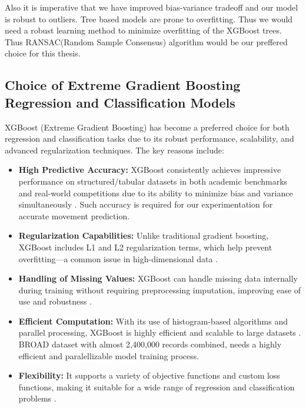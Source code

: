 \documentclass{iutbscthesis}
\begin{document}
\par
Also it is imperative that we have improved bias-variance tradeoff and our model is robust to outliers. Tree based models are prone to overfitting\cite{overfitTrees}. Thus we would need a robust learning method to minimize overfitting of the XGBoost trees. Thus RANSAC(Random Sample Consensus)\cite{fischler1981random}  algorithm would be our preffered choice for this thesis.

\subsection{Choice of Extreme Gradient Boosting Regression and Classification Models}
XGBoost (Extreme Gradient Boosting) has become a preferred choice for both regression and classification tasks due to its robust performance, scalability, and advanced regularization techniques. The key reasons include:

\begin{itemize}
    \item \textbf{High Predictive Accuracy:} XGBoost consistently achieves impressive performance on structured/tabular datasets in both academic benchmarks and real-world competitions due to its ability to minimize bias and variance simultaneously \cite{chen2016xgboost}. Such accuracy is required for our experimentation for accurate movement prediction.
    
    \item \textbf{Regularization Capabilities:} Unlike traditional gradient boosting, XGBoost includes L1 and L2 regularization terms, which help prevent overfitting—a common issue in high-dimensional data \cite{chen2016xgboost}.
    
    \item \textbf{Handling of Missing Values:} XGBoost can handle missing data internally during training without requiring preprocessing imputation, improving ease of use and robustness \cite{chen2016xgboost}.
    
    \item \textbf{Efficient Computation:} With its use of histogram-based algorithms and parallel processing, XGBoost is highly efficient and scalable to large datasets \cite{ke2017lightgbm}. BROAD dataset with almost 2,400,000 records combined, needs a highly efficient and paralellizable model training process.
    
    \item \textbf{Flexibility:} It supports a variety of objective functions and custom loss functions, making it suitable for a wide range of regression and classification problems \cite{chen2016xgboost}.
\end{itemize}
\end{document}
